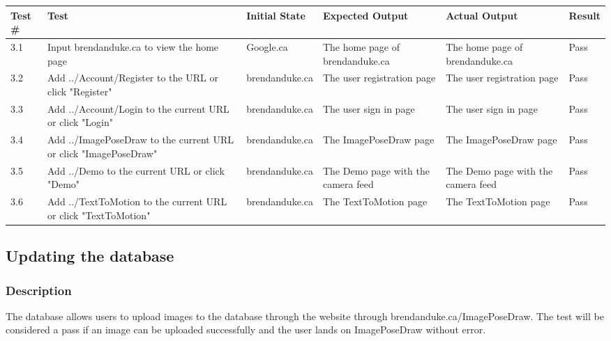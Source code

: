 \documentclass{scrreprt}
\begin{document}
\begin{table}[H]
        \centering
        \begin{tabular}[t]{||p{0.75cm}|p{4cm}|p{2.5cm}|p{3cm}|p{2.5cm}|p{0.75cm}||}
                \hline
                \textbf Test \# & \textbf Test & \textbf Initial State & \textbf Expected Output & \textbf Actual Output & \textbf Result\\
                \hline\hline
                3.1 & Input brendanduke.ca to view the home page & Google.ca & The home page of brendanduke.ca & The home page of brendanduke.ca & Pass \\
                \hline
                3.2 & Add ../Account/Register to the URL or click "Register" & brendanduke.ca & The user registration page & The user registration page & Pass \\
                \hline
                3.3 & Add ../Account/Login to the current URL or click "Login" & brendanduke.ca & The user sign in page & The user sign in page & Pass \\
                \hline
                3.4 & Add ../ImagePoseDraw to the current URL or click "ImagePoseDraw" & brendanduke.ca & The ImagePoseDraw page & The ImagePoseDraw page & Pass \\
                \hline
                3.5 &  Add ../Demo to the current URL or click "Demo" & brendanduke.ca & The Demo page with the camera feed & The Demo page with the camera feed & Pass \\
                \hline
                3.6 &  Add ../TextToMotion to the current URL or click "TextToMotion" & brendanduke.ca & The TextToMotion page & The TextToMotion page & Pass \\
                \hline
        \end{tabular}
\end{table}

\subsection{Updating the database}
\subsubsection{Description}

The database allows users to upload images to the database through the website through brendanduke.ca/ImagePoseDraw. The test will be considered a pass if an image can be uploaded successfully and the user lands on ImagePoseDraw without error.
\end{document}
